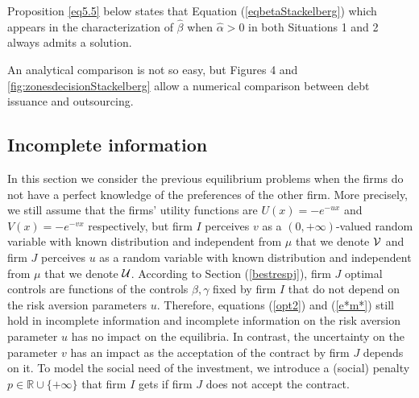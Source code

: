 \documentclass{svjour3}
\begin{document}
Proposition \ref{eq5.5} below states that Equation (\ref{eqbetaStackelberg}) which appears in the characterization of $\hat{\beta}$ when $\hat \alpha>0$ in both Situations 1 and 2 always admits a solution.

 An analytical comparison is not so easy, but Figures 4 and
 \ref{fig:zonesdecisionStackelberg} allow a numerical comparison between debt issuance and outsourcing.

\subsection{Incomplete information}
\label{incompl}
In this section we consider the previous equilibrium problems when the firms do not have a perfect knowledge of the preferences of the other firm. More precisely, we still assume that the firms' utility functions are $U(x)=-e^{-ux}$ and $V(x)=-e^{-vx}$ respectively, but firm $I$ perceives $v$ as 
 a $(0,+\infty)$-valued random variable  with known distribution and independent from $\mu$ that we denote ${\cal V}$ and firm $J$ perceives $u$ as a random variable with known distribution and independent from $\mu$
that we denote ${\cal U}$. According to Section (\ref{bestrespj}),  firm $J$ optimal controls are functions of the 
controls $\beta,\gamma$ fixed by firm $I$ that do not depend on the risk aversion parameters
 $u$. Therefore, equations (\ref{opt2}) and (\ref{e*m*})    still hold in incomplete information
  and  incomplete information on the risk aversion parameter $u$ has no impact on the equilibria. 
In contrast, the uncertainty on the parameter $v$ has an impact as the acceptation of the
 contract by firm $J$ depends on it.  To model the social need of the investment, we 
 introduce a (social) penalty $p\in\mathbb{R}\cup\{+\infty\}$ that firm $I$ gets if firm 
 $J$ does not accept the contract.
\end{document}

